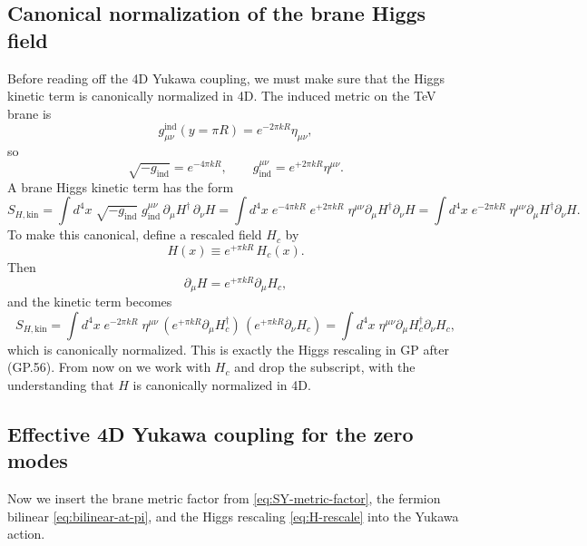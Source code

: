 \documentclass[11pt]{article}
\begin{document}
\subsection{Canonical normalization of the brane Higgs field}

Before reading off the 4D Yukawa coupling, we must make sure that the Higgs kinetic term is
canonically normalized in 4D. The induced metric on the TeV brane is
\[
g^{\text{ind}}_{\mu\nu}(y=\pi R)=e^{-2\pi kR}\eta_{\mu\nu},
\]
so
\[
\sqrt{-g_{\text{ind}}}=e^{-4\pi kR},
\qquad
g_{\text{ind}}^{\mu\nu}=e^{+2\pi kR}\eta^{\mu\nu}.
\]
A brane Higgs kinetic term has the form
\[
S_{H,\text{kin}}
=
\int d^4x\;\sqrt{-g_{\text{ind}}}\;
g_{\text{ind}}^{\mu\nu}\,
\partial_\mu H^\dagger\,\partial_\nu H
=
\int d^4x\;
e^{-4\pi kR}\;e^{+2\pi kR}\;
\eta^{\mu\nu}\partial_\mu H^\dagger\partial_\nu H
=
\int d^4x\;
e^{-2\pi kR}\;
\eta^{\mu\nu}\partial_\mu H^\dagger\partial_\nu H.
\]
To make this canonical, define a rescaled field $H_c$ by
\begin{equation}
H(x) \equiv e^{+\pi kR}\,H_c(x).
\label{eq:H-rescale}
\end{equation}
Then
\[
\partial_\mu H = e^{+\pi kR}\partial_\mu H_c,
\]
and the kinetic term becomes
\[
S_{H,\text{kin}}
=
\int d^4x\;
e^{-2\pi kR}\;
\eta^{\mu\nu}\,
(e^{+\pi kR}\partial_\mu H_c^\dagger)\,
(e^{+\pi kR}\partial_\nu H_c)
=
\int d^4x\;
\eta^{\mu\nu}\partial_\mu H_c^\dagger\partial_\nu H_c,
\]
which is canonically normalized. This is exactly the Higgs rescaling in GP after (GP.56). From now on we work with $H_c$ and drop the subscript, with the understanding that $H$ is
canonically normalized in 4D.

\subsection{Effective 4D Yukawa coupling for the zero modes}
Now we insert the brane metric factor from \eqref{eq:SY-metric-factor}, the fermion bilinear
\eqref{eq:bilinear-at-pi}, and the Higgs rescaling \eqref{eq:H-rescale} into the Yukawa action.
\end{document}
